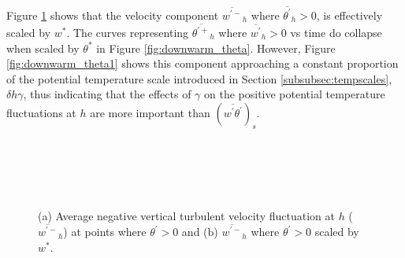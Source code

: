 Figure \ref{fig:downwarm_wvel} shows that the velocity component $\overline{w^{'-}}_{h}$  where $ \overline{\theta^{'}}_{h}>0$, is effectively scaled by $w^{*}$.  The curves representing $\overline{\theta^{'+}}_{h}$ where $\overline{w^{'}}_{h}>0$ vs time do collapse when scaled by $\theta^{*}$ in Figure \ref{fig:downwarm_theta}.  However, Figure \ref{fig:downwarm_theta1} shows this component approaching a constant proportion of the potential temperature scale introduced in Section \ref{subsubsec:tempscales}, $\delta h \gamma$, thus indicating that the effects of $\gamma$ on the positive potential temperature fluctuations at $h$ are more important than $(\overline{w^{'}\theta^{'}})_{s}$.\\ 
\\   

\begin{figure}[htbp]
\begin{minipage}[b]{0.5\linewidth}
        \\
        \end{minipage}             
\quad
\begin{minipage}[b]{0.5\linewidth}
        \\       
       \end{minipage}
        \caption[Downward turbulent velocity fluctuation at $h$]{(a) Average negative vertical turbulent velocity fluctuation at $h$ ($\overline{w^{\prime-}}_{h}$) at points where $\theta^{\prime}>0$ and (b) $\overline{w^{\prime-}}_{h}$ where $\theta^{\prime}>0$ scaled by $w^{*}$.}
        \label{fig:downwarm_wvel}
\end{figure}

